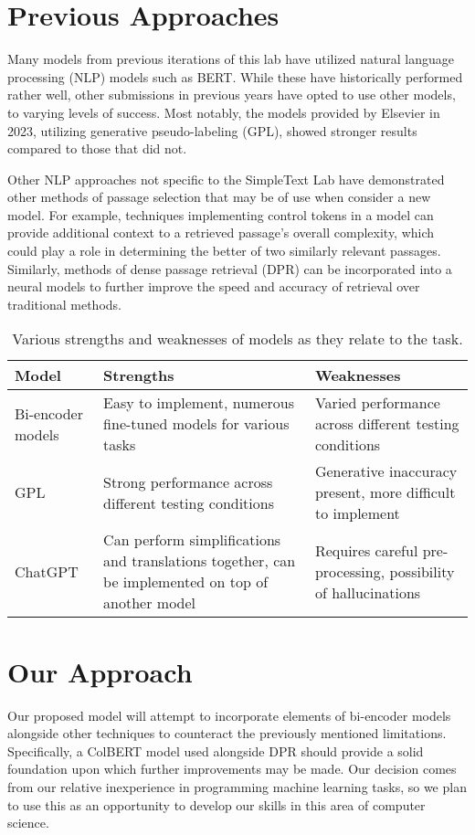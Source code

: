 \documentclass[runningheads]{llncs}
\begin{document}
\section{Previous Approaches} \label{past}
Many models from previous iterations of this lab have utilized natural language processing (NLP) models such as BERT\cite{amsterdam, maine}. While these have historically performed rather well, other submissions in previous years have opted to use other models, to varying levels of success. Most notably, the models provided by Elsevier\cite{elsevier} in 2023, utilizing generative pseudo-labeling (GPL), showed stronger results compared to those that did not.

Other NLP approaches not specific to the SimpleText Lab have demonstrated other methods of passage selection that may be of use when consider a new model. For example, techniques implementing control tokens in a model\cite{control} can provide additional context to a retrieved passage's overall complexity, which could play a role in determining the better of two similarly relevant passages. Similarly, methods of dense passage retrieval (DPR) can be incorporated into a neural models to further improve the speed and accuracy of retrieval over traditional methods\cite{dense}.

\begin{table}
\caption{Various strengths and weaknesses of models as they relate to the task.}\label{tab1}
\begin{tabular}{|p{2cm}|p{5cm}|p{5cm}|}
\hline
Model & Strengths & Weaknesses\\
\hline
Bi-encoder models\cite{bert} & Easy to implement, numerous fine-tuned models for various tasks & Varied performance across different testing conditions\\
\hline
GPL\cite{elsevier} & Strong performance across different testing conditions & Generative inaccuracy present, more difficult to implement\\
\hline
ChatGPT\cite{simplification} & Can perform simplifications and translations together, can be implemented on top of another model & Requires careful pre-processing, possibility of hallucinations\\
\hline
\end{tabular}
\end{table}

\section{Our Approach} \label{approach}
Our proposed model will attempt to incorporate elements of bi-encoder models alongside other techniques to counteract the previously mentioned limitations. Specifically, a ColBERT model\cite{colbert} used alongside DPR should provide a solid foundation upon which further improvements may be made. Our decision comes from our relative inexperience in programming machine learning tasks, so we plan to use this as an opportunity to develop our skills in this area of computer science.
\end{document}
